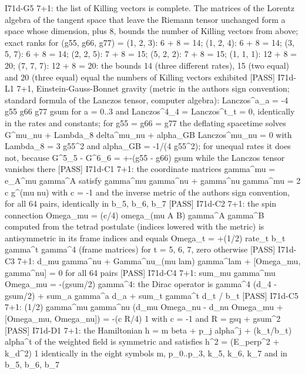 \documentclass[
  10pt,
]{article}
\newenvironment{Shaded}{}{}
\newcommand{\NormalTok}[1]{#1}
\begin{document}
\begin{Shaded}
\begin{Highlighting}[]
\NormalTok{[PASS] I71d{-}G5  7+1: the list of Killing vectors is complete. The matrices of the Lorentz algebra of the tangent space that leave the Riemann tensor unchanged form a space whose dimension, plus 8, bounds the number of Killing vectors from above; exact ranks for (g55, g66, g77) = (1, 2, 3): 6 + 8 = 14; (1, 2, 4): 6 + 8 = 14; (3, 5, 7): 6 + 8 = 14; (2, 2, 5): 7 + 8 = 15; (5, 2, 2): 7 + 8 = 15; (1, 1, 1): 12 + 8 = 20; (7, 7, 7): 12 + 8 = 20: the bounds 14 (three different rates), 15 (two equal) and 20 (three equal) equal the numbers of Killing vectors exhibited}
\NormalTok{[PASS] I71d{-}L1  7+1, Einstein{-}Gauss{-}Bonnet gravity (metric in the author\textquotesingle{}s sign convention; standard formula of the Lanczos tensor, computer algebra): Lanczos\^{}a\_a = {-}4 g55 g66 g77 gsum for a = 0..3 and Lanczos\^{}4\_4 = Lanczos\^{}t\_t = 0, identically in the rates and constants; for g55 = g66 = g77 the deflating spacetime solves G\^{}mu\_nu + Lambda\_8 delta\^{}mu\_nu + alpha\_GB Lanczos\^{}mu\_nu = 0 with Lambda\_8 = 3 g55\^{}2 and alpha\_GB = {-}1/(4 g55\^{}2); for unequal rates it does not, because G\^{}5\_5 {-} G\^{}6\_6 = +{-}(g55 {-} g66) gsum while the Lanczos tensor vanishes there}
\NormalTok{[PASS] I71d{-}C1  7+1: the coordinate matrices gamma\^{}mu = e\_A\^{}mu gamma\^{}A satisfy gamma\^{}mu gamma\^{}nu + gamma\^{}nu gamma\^{}mu = 2 c g\^{}(mu nu) with c = {-}1 and the inverse metric of the author\textquotesingle{}s sign convention, for all 64 pairs, identically in b\_5, b\_6, b\_7}
\NormalTok{[PASS] I71d{-}C2  7+1: the spin connection Omega\_mu = (c/4) omega\_(mu A B) gamma\^{}A gamma\^{}B computed from the tetrad postulate (indices lowered with the metric) is antisymmetric in its frame indices and equals Omega\_t = +(1/2) rate\_t b\_t gamma\^{}t gamma\^{}4 (frame matrices) for t = 5, 6, 7, zero otherwise}
\NormalTok{[PASS] I71d{-}C3  7+1: d\_mu gamma\^{}nu + Gamma\^{}nu\_(mu lam) gamma\^{}lam + [Omega\_mu, gamma\^{}nu] = 0 for all 64 pairs}
\NormalTok{[PASS] I71d{-}C4  7+1: sum\_mu gamma\^{}mu Omega\_mu = {-}(gsum/2) gamma\^{}4: the Dirac operator is gamma\^{}4 (d\_4 {-} gsum/2) + sum\_a gamma\^{}a d\_a + sum\_t gamma\^{}t d\_t / b\_t}
\NormalTok{[PASS] I71d{-}C5  7+1: (1/2) gamma\^{}mu gamma\^{}nu (d\_mu Omega\_nu {-} d\_nu Omega\_mu + [Omega\_mu, Omega\_nu]) = {-}(c R/4) 1 with c = {-}1 and R = gsq + gsum\^{}2}
\NormalTok{[PASS] I71d{-}D1  7+1: the Hamiltonian h = m beta + p\_j alpha\^{}j + (k\_t/b\_t) alpha\^{}t of the weighted field is symmetric and satisfies h\^{}2 = (E\_perp\^{}2 + k\_d\^{}2) 1 identically in the eight symbols m, p\_0..p\_3, k\_5, k\_6, k\_7 and in b\_5, b\_6, b\_7}

\end{Highlighting}
\end{Shaded}
\end{document}
